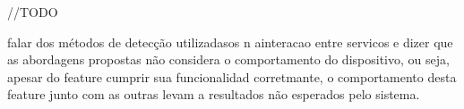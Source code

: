 //TODO

falar dos métodos de detecção utilizadasos n ainteracao entre servicos e dizer que as abordagens propostas não considera o comportamento do dispositivo, ou seja, apesar do feature cumprir sua funcionalidad corretmante, o comportamento desta feature junto com as outras levam a resultados não esperados pelo sistema.